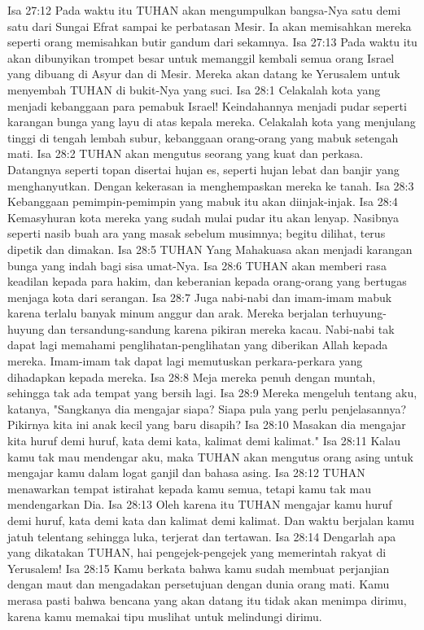 Isa 27:12  Pada waktu itu TUHAN akan mengumpulkan bangsa-Nya satu demi satu dari Sungai Efrat sampai ke perbatasan Mesir. Ia akan memisahkan mereka seperti orang memisahkan butir gandum dari sekamnya.
Isa 27:13  Pada waktu itu akan dibunyikan trompet besar untuk memanggil kembali semua orang Israel yang dibuang di Asyur dan di Mesir. Mereka akan datang ke Yerusalem untuk menyembah TUHAN di bukit-Nya yang suci.
Isa 28:1  Celakalah kota yang menjadi kebanggaan para pemabuk Israel! Keindahannya menjadi pudar seperti karangan bunga yang layu di atas kepala mereka. Celakalah kota yang menjulang tinggi di tengah lembah subur, kebanggaan orang-orang yang mabuk setengah mati.
Isa 28:2  TUHAN akan mengutus seorang yang kuat dan perkasa. Datangnya seperti topan disertai hujan es, seperti hujan lebat dan banjir yang menghanyutkan. Dengan kekerasan ia menghempaskan mereka ke tanah.
Isa 28:3  Kebanggaan pemimpin-pemimpin yang mabuk itu akan diinjak-injak.
Isa 28:4  Kemasyhuran kota mereka yang sudah mulai pudar itu akan lenyap. Nasibnya seperti nasib buah ara yang masak sebelum musimnya; begitu dilihat, terus dipetik dan dimakan.
Isa 28:5  TUHAN Yang Mahakuasa akan menjadi karangan bunga yang indah bagi sisa umat-Nya.
Isa 28:6  TUHAN akan memberi rasa keadilan kepada para hakim, dan keberanian kepada orang-orang yang bertugas menjaga kota dari serangan.
Isa 28:7  Juga nabi-nabi dan imam-imam mabuk karena terlalu banyak minum anggur dan arak. Mereka berjalan terhuyung-huyung dan tersandung-sandung karena pikiran mereka kacau. Nabi-nabi tak dapat lagi memahami penglihatan-penglihatan yang diberikan Allah kepada mereka. Imam-imam tak dapat lagi memutuskan perkara-perkara yang dihadapkan kepada mereka.
Isa 28:8  Meja mereka penuh dengan muntah, sehingga tak ada tempat yang bersih lagi.
Isa 28:9  Mereka mengeluh tentang aku, katanya, "Sangkanya dia mengajar siapa? Siapa pula yang perlu penjelasannya? Pikirnya kita ini anak kecil yang baru disapih?
Isa 28:10  Masakan dia mengajar kita huruf demi huruf, kata demi kata, kalimat demi kalimat."
Isa 28:11  Kalau kamu tak mau mendengar aku, maka TUHAN akan mengutus orang asing untuk mengajar kamu dalam logat ganjil dan bahasa asing.
Isa 28:12  TUHAN menawarkan tempat istirahat kepada kamu semua, tetapi kamu tak mau mendengarkan Dia.
Isa 28:13  Oleh karena itu TUHAN mengajar kamu huruf demi huruf, kata demi kata dan kalimat demi kalimat. Dan waktu berjalan kamu jatuh telentang sehingga luka, terjerat dan tertawan.
Isa 28:14  Dengarlah apa yang dikatakan TUHAN, hai pengejek-pengejek yang memerintah rakyat di Yerusalem!
Isa 28:15  Kamu berkata bahwa kamu sudah membuat perjanjian dengan maut dan mengadakan persetujuan dengan dunia orang mati. Kamu merasa pasti bahwa bencana yang akan datang itu tidak akan menimpa dirimu, karena kamu memakai tipu muslihat untuk melindungi dirimu.
